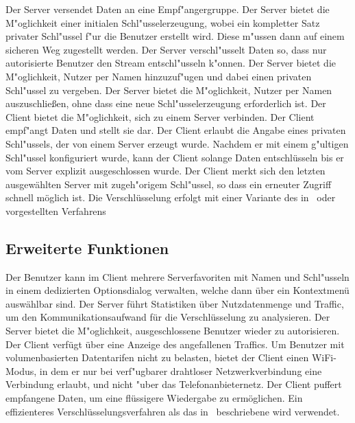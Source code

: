 \documentclass[a4paper,10pt]{scrartcl}
\begin{document}
\begin{usecase}
 {Der Server versendet Daten an eine Empf"angergruppe.}
 {Der Server bietet die M"oglichkeit einer initialen Schl"usselerzeugung, wobei
                 ein kompletter Satz privater Schl"ussel f"ur die Benutzer erstellt wird.
                 Diese m"ussen dann auf einem sicheren Weg zugestellt werden.}
 {Der Server verschl"usselt Daten so, dass nur autorisierte
                 Benutzer den Stream entschl"usseln k"onnen.}
 {Der Server bietet die M"oglichkeit, Nutzer per Namen hinzuzuf"ugen und dabei
                 einen privaten Schl"ussel zu vergeben.}
 {Der Server bietet die M"oglichkeit, Nutzer per Namen auszuschließen,
                 ohne dass eine neue Schl"usselerzeugung erforderlich ist.}
 {Der Client bietet die M"oglichkeit, sich zu einem Server verbinden.}
 {Der Client empf"angt Daten und stellt sie dar.}
 {Der Client erlaubt die Angabe eines privaten Schl"ussels, der von
                 einem Server erzeugt wurde.}
 {Nachdem er mit einem g"ultigen Schl"ussel konfiguriert wurde, kann der
                 Client solange Daten entschlüsseln bis er vom Server explizit ausgeschlossen wurde.}
 {Der Client merkt sich den letzten ausgewählten Server mit
                  zugeh"origem Schl"ussel, so dass ein erneuter Zugriff schnell möglich
                  ist.}
 {Die Verschlüsselung erfolgt mit einer Variante des in~\cite[Section 2.2]{Naor00}
                  oder~\cite{Garg10} vorgestellten Verfahrens}
\end{usecase}

\subsection{Erweiterte Funktionen}

\begin{usecase}
 {Der Benutzer kann im Client mehrere Serverfavoriten
                  mit Namen und Schl"usseln in einem dedizierten Optionsdialog verwalten,
                  welche dann über ein Kontextmenü auswählbar sind.}
 {Der Server führt Statistiken über Nutzdatenmenge und Traffic,
                  um den Kommunikationsaufwand für die Verschlüsselung zu
                  analysieren.}
 {Der Server bietet die M"oglichkeit, ausgeschlossene Benutzer wieder
                  zu autorisieren.}
 {Der Client verfügt über eine Anzeige des angefallenen Traffics.}
 {Um Benutzer mit volumenbasierten Datentarifen nicht zu belasten,
                  bietet der Client einen WiFi-Modus, in dem er nur bei
                  verf"ugbarer drahtloser Netzwerkverbindung eine Verbindung erlaubt,
                  und nicht "uber das Telefonanbieternetz.}
 {Der Client puffert empfangene Daten, um eine flüssigere
                  Wiedergabe zu ermöglichen.}
 {Ein effizienteres Verschlüsselungsverfahren als das in~\cite{Naor00} beschriebene
                  wird verwendet.}
\end{usecase}
\end{document}
